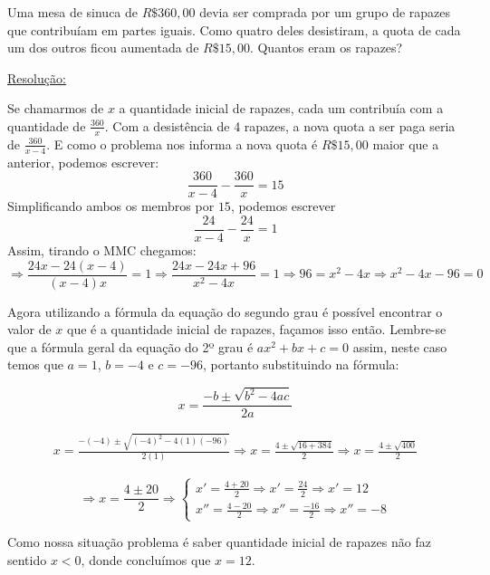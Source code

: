 \begin{exem}
 Uma mesa de sinuca de $R\$ 360,00$ devia ser comprada por um grupo de rapazes que contribuíam em partes iguais. Como quatro deles desistiram, a quota de cada um dos outros ficou aumentada de $R\$ 15,00$. Quantos eram os rapazes?

 \underline{Resolução:}

 Se chamarmos de $x$ a quantidade inicial de rapazes, cada um contribuía com a quantidade de $\frac{360}{x}$. Com a desistência de 4 rapazes, a nova quota a ser paga seria de $\frac{360}{x - 4}$. E como o problema nos informa a nova quota é $R\$ 15,00$ maior que a anterior, podemos escrever:
\begin{equation}
\frac{360}{x - 4} - \frac{360}{x} = 15
\end{equation}
 Simplificando ambos os membros por $15$, podemos escrever
\begin{equation}
\frac{24}{x - 4} - \frac{24}{x} = 1
\end{equation}
 Assim, tirando o MMC chegamos:
 \begin{equation*}
  \Rightarrow \frac{24 x - 24(x-4)}{(x - 4)x} = 1 \Rightarrow \frac{24x - 24x + 96}{x^2 - 4x} = 1
  \Rightarrow 96 = x^2 - 4x \Rightarrow x^2 - 4x - 96 = 0
 \end{equation*}

 Agora utilizando a fórmula da equação do segundo grau é possível encontrar o valor de $x$ que é a quantidade inicial de rapazes, façamos isso então. Lembre-se que a fórmula geral da equação do 2º grau é $ax^2 + bx + c = 0$ assim, neste caso temos que $a = 1$, $b = -4$ e $c = -96$, portanto substituindo na fórmula:

\begin{equation}
 x= \frac{-b \pm \sqrt{b^2 - 4ac}}{2a} 
\end{equation}

 \begin{eqnarray*}
  x= \frac{-(-4) \pm \sqrt{(-4)^2 - 4(1)(-96)}}{2(1)} \Rightarrow
  x = \frac{4 \pm \sqrt{16 + 384}}{2} \Rightarrow
  x = \frac{4 \pm \sqrt{400}}{2}
 \end{eqnarray*}

\[ \Rightarrow x = \frac{4 \pm 20}{2} \Rightarrow \begin{cases}
                                                  x' = \frac{4 + 20}{2} \Rightarrow x' = \frac{24}{2} \Rightarrow x' = 12 \\
                                                  x'' = \frac{4 - 20}{2} \Rightarrow x'' = \frac{-16}{2} \Rightarrow x'' = -8
                                                 \end{cases}\]

Como nossa situação problema é saber quantidade inicial de rapazes não faz sentido $x < 0$, donde concluímos que $x = 12$.
\fim
\end{exem}


